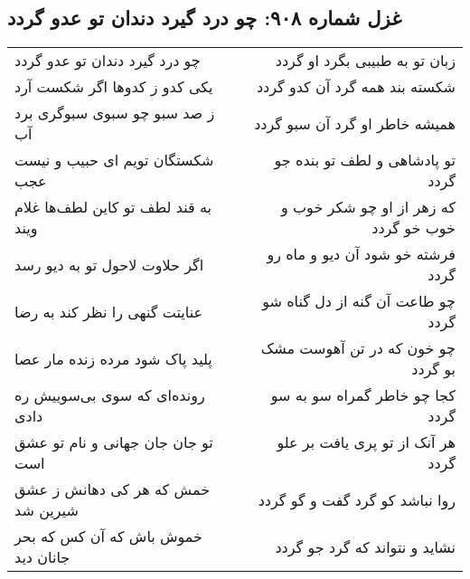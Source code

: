 \begin{center}
\section*{غزل شماره ۹۰۸: چو درد گیرد دندان تو عدو گردد}
\label{sec:0908}
\begin{longtable}{l p{0.5cm} r}
چو درد گیرد دندان تو عدو گردد
&&
زبان تو به طبیبی بگرد او گردد
\\
یکی کدو ز کدوها اگر شکست آرد
&&
شکسته بند همه گرد آن کدو گردد
\\
ز صد سبو چو سبوی سبوگری برد آب
&&
همیشه خاطر او گرد آن سبو گردد
\\
شکستگان تویم ای حبیب و نیست عجب
&&
تو پادشاهی و لطف تو بنده جو گردد
\\
به قند لطف تو کاین لطف‌ها غلام ویند
&&
که زهر از او چو شکر خوب و خوب خو گردد
\\
اگر حلاوت لاحول تو به دیو رسد
&&
فرشته خو شود آن دیو و ماه رو گردد
\\
عنایتت گنهی را نظر کند به رضا
&&
چو طاعت آن گنه از دل گناه شو گردد
\\
پلید پاک شود مرده زنده مار عصا
&&
چو خون که در تن آهوست مشک بو گردد
\\
رونده‌ای که سوی بی‌سوییش ره دادی
&&
کجا چو خاطر گمراه سو به سو گردد
\\
تو جان جان جهانی و نام تو عشق است
&&
هر آنک از تو پری یافت بر علو گردد
\\
خمش که هر کی دهانش ز عشق شیرین شد
&&
روا نباشد کو گرد گفت و گو گردد
\\
خموش باش که آن کس که بحر جانان دید
&&
نشاید و نتواند که گرد جو گردد
\\
\end{longtable}
\end{center}
